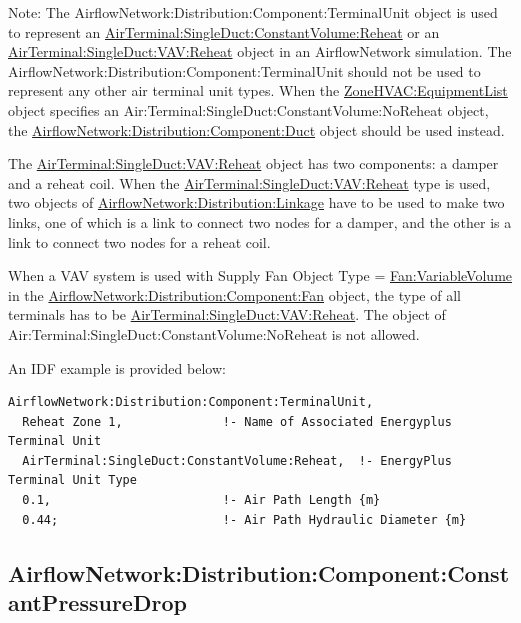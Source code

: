 Note: The AirflowNetwork:Distribution:Component:TerminalUnit object is used to represent an \hyperref[airterminalsingleductconstantvolumereheat]{AirTerminal:SingleDuct:ConstantVolume:Reheat} or an \hyperref[airterminalsingleductvavreheat]{AirTerminal:SingleDuct:VAV:Reheat} object in an AirflowNetwork simulation. The AirflowNetwork:Distribution:Component:TerminalUnit should not be used to represent any other air terminal unit types. When the \hyperref[zonehvacequipmentlist]{ZoneHVAC:EquipmentList} object specifies an Air:Terminal:SingleDuct:ConstantVolume:NoReheat object, the \hyperref[airflownetworkdistributioncomponentduct]{AirflowNetwork:Distribution:Component:Duct} object should be used instead.

The \hyperref[airterminalsingleductvavreheat]{AirTerminal:SingleDuct:VAV:Reheat} object has two components: a damper and a reheat coil. When the \hyperref[airterminalsingleductvavreheat]{AirTerminal:SingleDuct:VAV:Reheat} type is used, two objects of \hyperref[airflownetworkdistributionlinkage]{AirflowNetwork:Distribution:Linkage} have to be used to make two links, one of which is a link to connect two nodes for a damper, and the other is a link to connect two nodes for a reheat coil.

When a VAV system is used with Supply Fan Object Type = \hyperref[fanvariablevolume]{Fan:VariableVolume} in the \hyperref[airflownetworkdistributioncomponentfan]{AirflowNetwork:Distribution:Component:Fan} object, the type of all terminals has to be \hyperref[airterminalsingleductvavreheat]{AirTerminal:SingleDuct:VAV:Reheat}. The object of Air:Terminal:SingleDuct:ConstantVolume:NoReheat is not allowed.

An IDF example is provided below:

\begin{lstlisting}
AirflowNetwork:Distribution:Component:TerminalUnit,
  Reheat Zone 1,              !- Name of Associated Energyplus Terminal Unit
  AirTerminal:SingleDuct:ConstantVolume:Reheat,  !- EnergyPlus Terminal Unit Type
  0.1,                        !- Air Path Length {m}
  0.44;                       !- Air Path Hydraulic Diameter {m}
\end{lstlisting}

\subsection{AirflowNetwork:Distribution:Component:ConstantPressureDrop}\label{airflownetworkdistributioncomponentconstantpressuredrop}

